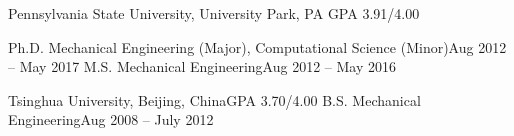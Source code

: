 \documentclass[10pt,a4paper]{article}
\begin{document}
        


\spacedhrule{0em}{-0.8em}


\headedsection
{Pennsylvania State University, University Park, PA}
{GPA 3.91/4.00}{

  \headedsubsection
  {Ph.D. Mechanical Engineering (Major), Computational Science (Minor)}{Aug 2012
    -- May 2017}{}
  \headedsubsection
  {M.S. Mechanical Engineering}{Aug 2012
    -- May 2016}{\vspace{0.3em}}
}
\vspace{0.1em}
\headedsection
{Tsinghua University, Beijing, China}{GPA 3.70/4.00}{
	\headedsubsection
  {B.S. Mechanical Engineering}{Aug 2008 -- July 2012}{}
}
\end{document}
